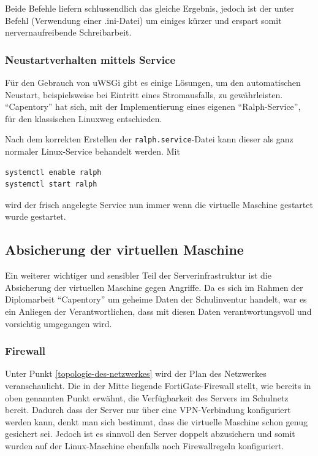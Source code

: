 Beide Befehle liefern schlussendlich das gleiche Ergebnis, jedoch ist
der unter Befehl (Verwendung einer .ini-Datei) um einiges kürzer und
erspart somit nervernaufreibende Schreibarbeit.

\hypertarget{neustartverhalten-mittels-service}{%
\subsubsection{Neustartverhalten mittels
Service}\label{neustartverhalten-mittels-service}}

Für den Gebrauch von uWSGi gibt es einige Lösungen, um den automatischen
Neustart, beispielsweise bei Eintritt eines Stromausfalls, zu
gewährleisten. ``Capentory'' hat sich, mit der Implementierung eines
eigenen ``Ralph-Service'', für den klassischen Linuxweg entschieden.

Nach dem korrekten Erstellen der \texttt{ralph.service}-Datei kann
dieser als ganz normaler Linux-Service behandelt werden. Mit

\begin{verbatim}
systemctl enable ralph
systemctl start ralph
\end{verbatim}

wird der frisch angelegte Service nun immer wenn die virtuelle Maschine
gestartet wurde gestartet.

\hypertarget{absicherung-der-virtuellen-maschine}{%
\subsection{Absicherung der virtuellen
Maschine}\label{absicherung-der-virtuellen-maschine}}

Ein weiterer wichtiger und sensibler Teil der Serverinfrastruktur ist
die Absicherung der virtuellen Maschine gegen Angriffe. Da es sich im
Rahmen der Diplomarbeit ``Capentory'' um geheime Daten der Schulinventur
handelt, war es ein Anliegen der Verantwortlichen, dass mit diesen Daten
verantwortungsvoll und vorsichtig umgegangen wird.

\hypertarget{firewall}{%
\subsubsection{Firewall}\label{firewall}}

Unter Punkt \ref{topologie-des-netzwerkes} wird der Plan des Netzwerkes
veranschaulicht. Die in der Mitte liegende FortiGate-Firewall stellt,
wie bereits in oben genannten Punkt erwähnt, die Verfügbarkeit des
Servers im Schulnetz bereit. Dadurch dass der Server nur über eine
VPN-Verbindung konfiguriert werden kann, denkt man sich bestimmt, dass
die virtuelle Maschine schon genug gesichert sei. Jedoch ist es sinnvoll
den Server doppelt abzusichern und somit wurden auf der Linux-Maschine
ebenfalls noch Firewallregeln konfiguriert.

